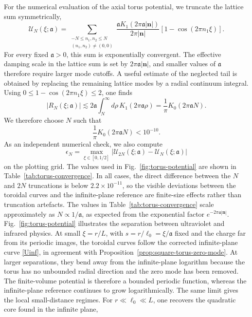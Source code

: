 \documentclass[nopacs,amsmath,amsfonts,amssymb,aps,superscriptaddress]{revtex4}
\begin{document}
For the numerical evaluation of the axial torus potential, we truncate the lattice sum symmetrically,
\begin{equation}
\mathcal U_N(\xi;\mathfrak a)=\sum_{\substack{-N\leq n_1,n_2\leq N\\(n_1,n_2)\neq(0,0)}}
\frac{\mathfrak a K_1(2\pi\mathfrak a|\mathbf n|)}{2\pi|\mathbf n|}
\left[1-\cos(2\pi n_1\xi)\right].
\end{equation}
For every fixed \(\mathfrak a>0\), this sum is exponentially convergent. The effective damping scale in the lattice sum is set by \(2\pi\mathfrak a|\mathbf n|\), and smaller values of \(\mathfrak a\) therefore require larger mode cutoffs. A useful estimate of the neglected tail is obtained by replacing the remaining lattice modes by a radial continuum integral. Using \(0\leq1-\cos(2\pi n_1\xi)\leq2\), one finds
\begin{equation}
  |R_N(\xi;\mathfrak a)|\lesssim2\mathfrak a\int_N^\infty d\rho\,K_1(2\pi\mathfrak a\rho)
  =\frac{1}{\pi}K_0(2\pi\mathfrak a N).
\end{equation}
We therefore choose \(N\) such that
\begin{equation}\label{cutoff}
  \frac{1}{\pi}K_0(2\pi\mathfrak a N)<10^{-10}.
\end{equation}
As an independent numerical check, we also compute
\begin{equation}\label{error}
\epsilon_N=\max_{\xi\in[0,1/2]}\left|\mathcal U_{2N}(\xi;\mathfrak a)-\mathcal U_N(\xi;\mathfrak a)\right|
\end{equation}
on the plotting grid. The values used in Fig.~\ref{fig:torus-potential} are shown in Table~\ref{tab:torus-convergence}. In all cases, the direct difference between the \(N\) and \(2N\) truncations is below \(2.2\times10^{-11}\), so the visible deviations between the toroidal curves and the infinite-plane reference are finite-size effects rather than truncation artefacts. The values in Table~\ref{tab:torus-convergence} scale approximately as \(N\propto1/\mathfrak a\), as expected from the exponential factor \(e^{-2\pi\mathfrak a|\mathbf n|}\). Fig.~\ref{fig:torus-potential} illustrates the separation between ultraviolet and infrared physics. At small \(\xi=r/L\), with \(s=r/\ell_0=\xi/\mathfrak a\) fixed and the charge far from its periodic images, the toroidal curves follow the corrected infinite-plane curve \eqref{Uinf}, in agreement with Proposition~\ref{prop:square-torus-zero-mode}. At larger separations, they bend away from the infinite-plane logarithm because the torus has no unbounded radial direction and the zero mode has been removed. The finite-volume potential is therefore a bounded periodic function, whereas the infinite-plane reference continues to grow logarithmically. The same limit gives the local small-distance regimes. For \(r\ll\ell_0\ll L\), one recovers the quadratic core found in the infinite plane,
\end{document}
